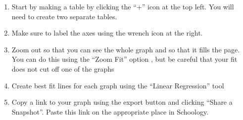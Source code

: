 \documentclass[10pt]{exam}
\begin{document}
\begin{multicols}{2}

\begin{enumerate}[label=\alph*),topsep=0pt,itemsep=-1ex,partopsep=1ex,parsep=1ex]
  \item \label{table} Start by making a table by clicking the “+” icon at the top left.  You will need to create two separate tables.
  \item \label{wrench} Make sure to label the axes using the wrench icon at the right.
  \item \label{zoom} Zoom out so that you can see the whole graph and so that it fills the page.  You can do this using the ``Zoom Fit'' option , but be careful that your fit does not cut off one of the graphs
  \item \label{linear} Create best fit lines for each graph using the ``Linear Regression'' tool
  \item Copy a link to your graph using the export button and clicking ``Share a Snapshot''.  Paste this link on the appropriate place in Schoology.
\end{enumerate}

\end{multicols}
\end{document}
